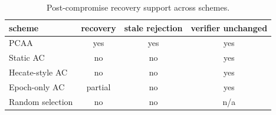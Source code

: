 \begin{table}[htbp]
\centering
\caption{Post-compromise recovery support across schemes.}
\label{tab:recovery-baseline}
\begin{tabular}{@{}lccc@{}}
\toprule
scheme & recovery & stale rejection & verifier unchanged \\
\midrule
PCAA & yes & yes & yes \\
Static AC & no & no & yes \\
Hecate-style AC & no & no & yes \\
Epoch-only AC & partial & no & yes \\
Random selection & no & no & n/a \\
\bottomrule
\end{tabular}
\end{table}
